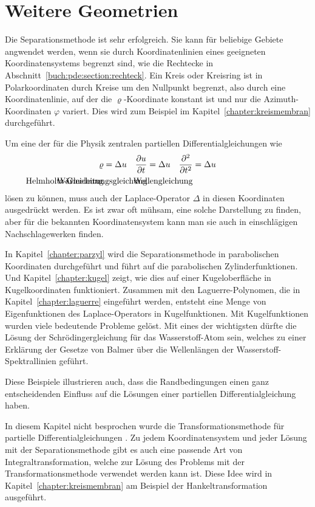 %
%
%
\section{Weitere Geometrien
\label{buch:pde:section:geometrie}}
Die Separationsmethode ist sehr erfolgreich.
Sie kann für beliebige Gebiete angwendet werden, wenn sie durch
Koordinatenlinien eines geeigneten Koordinatensystems begrenzt sind,
wie die Rechtecke in Abschnitt~\ref{buch:pde:section:rechteck}.
Ein Kreis oder Kreisring ist in Polarkoordinaten durch Kreise
um den Nullpunkt begrenzt, also durch eine Koordinatenlinie, auf
der die $\varrho$-Koordinate konstant ist und nur die Azimuth-Koordinaten
$\varphi$ variert.
Dies wird zum Beispiel im Kapitel~\ref{chapter:kreismembran}
durchgeführt.

Um eine der für die Physik zentralen partiellen Differentialgleichungen
wie
\begin{align*}
\varrho
&=
\Delta u
&
\frac{\partial u}{\partial t}
&=
\Delta u
&
\frac{\partial^2}{\partial t^2}
&=
\Delta u
\\
&\llap{\hspace{-1cm}\text{Helmholtz-Gleichung}}
&
&\llap{\hspace{-1cm}\text{Wärmeleitungsgleichung}}
&
&\llap{\hspace{-1cm}\text{Wellengleichung}}
\end{align*}
lösen zu können, muss auch der Laplace-Operator $\Delta$ in diesen
Koordinaten ausgedrückt werden.
Es ist zwar oft mühsam, eine solche Darstellung zu finden, aber
für die bekannten Koordinatensystem kann man sie auch in einschlägigen
Nachschlagewerken finden.

In Kapitel~\ref{chapter:parzyl} wird die Separationsmethode 
in parabolischen Koordinaten durchgeführt und führt auf die parabolischen
Zylinderfunktionen.
Und Kapitel~\ref{chapter:kugel} zeigt, wie dies auf einer Kugeloberfläche
in Kugelkoordinaten funktioniert.
Zusammen mit den Laguerre-Polynomen, die in Kapitel~\ref{chapter:laguerre}
eingeführt werden, entsteht eine Menge von Eigenfunktionen des
Laplace-Operators in Kugelfunktionen.
Mit Kugelfunktionen wurden viele bedeutende Probleme gelöst.
Mit eines der wichtigsten dürfte die Lösung der Schrödingergleichung
für das Wasserstoff-Atom sein, welches zu einer Erklärung der
Gesetze von Balmer über die Wellenlängen der Wasserstoff-Spektrallinien
geführt.

Diese Beispiele illustrieren auch, dass die Randbedingungen einen
ganz entscheidenden Einfluss auf die Lösungen einer partiellen
Differentialgleichung haben.

In diesem Kapitel nicht besprochen wurde die Transformationsmethode
für partielle Differentialgleichungen \cite[chapter 5]{buch:partdiff}.
Zu jedem Koordinatensystem und jeder Lösung mit der Separationsmethode
gibt es auch eine passende Art von Integraltransformation, welche zur
Lösung des Problems mit der Transformationsmethode verwendet werden
kann ist.
Diese Idee wird in Kapitel~\ref{chapter:kreismembran}
am Beispiel der Hankeltransformation ausgeführt.




